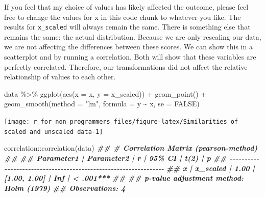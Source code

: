\documentclass[
]{book}
\newenvironment{Shaded}{\begin{snugshade}}{\end{snugshade}}
\newcommand{\AttributeTok}[1]{\textcolor[rgb]{0.77,0.63,0.00}{#1}}
\newcommand{\ConstantTok}[1]{\textcolor[rgb]{0.00,0.00,0.00}{#1}}
\newcommand{\DocumentationTok}[1]{\textcolor[rgb]{0.56,0.35,0.01}{\textbf{\textit{#1}}}}
\newcommand{\FunctionTok}[1]{\textcolor[rgb]{0.00,0.00,0.00}{#1}}
\newcommand{\NormalTok}[1]{#1}
\newcommand{\SpecialCharTok}[1]{\textcolor[rgb]{0.00,0.00,0.00}{#1}}
\newcommand{\StringTok}[1]{\textcolor[rgb]{0.31,0.60,0.02}{#1}}
\begin{document}
If you feel that my choice of values has likely affected the outcome, please feel free to change the values for x in this code chunk to whatever you like. The results for \texttt{x\_scaled} will always remain the same. There is something else that remains the same: the actual distribution. Because we are only rescaling our data, we are not affecting the differences between these scores. We can show this in a scatterplot and by running a correlation. Both will show that these variables are perfectly correlated. Therefore, our transformations did not affect the relative relationship of values to each other.

\begin{Shaded}
\begin{Highlighting}[]
\NormalTok{data }\SpecialCharTok{\%\textgreater{}\%}
  \FunctionTok{ggplot}\NormalTok{(}\FunctionTok{aes}\NormalTok{(}\AttributeTok{x =}\NormalTok{ x,}
             \AttributeTok{y =}\NormalTok{ x\_scaled)) }\SpecialCharTok{+}
  \FunctionTok{geom\_point}\NormalTok{() }\SpecialCharTok{+}
  \FunctionTok{geom\_smooth}\NormalTok{(}\AttributeTok{method =} \StringTok{"lm"}\NormalTok{,}
              \AttributeTok{formula =}\NormalTok{ y }\SpecialCharTok{\textasciitilde{}}\NormalTok{ x,}
              \AttributeTok{se =} \ConstantTok{FALSE}\NormalTok{)}
\end{Highlighting}
\end{Shaded}

\begin{center}\texttt{[image: r\_for\_non\_programmers\_files/figure-latex/Similarities of scaled and unscaled data-1]} \end{center}

\begin{Shaded}
\begin{Highlighting}[]
\NormalTok{correlation}\SpecialCharTok{::}\FunctionTok{correlation}\NormalTok{(data)}
\DocumentationTok{\#\# \# Correlation Matrix (pearson{-}method)}
\DocumentationTok{\#\# }
\DocumentationTok{\#\# Parameter1 | Parameter2 |    r |       95\% CI | t(2) |         p}
\DocumentationTok{\#\# {-}{-}{-}{-}{-}{-}{-}{-}{-}{-}{-}{-}{-}{-}{-}{-}{-}{-}{-}{-}{-}{-}{-}{-}{-}{-}{-}{-}{-}{-}{-}{-}{-}{-}{-}{-}{-}{-}{-}{-}{-}{-}{-}{-}{-}{-}{-}{-}{-}{-}{-}{-}{-}{-}{-}{-}{-}{-}{-}{-}{-}{-}{-}{-}}
\DocumentationTok{\#\# x          |   x\_scaled | 1.00 | [1.00, 1.00] |  Inf | \textless{} .001***}
\DocumentationTok{\#\# }
\DocumentationTok{\#\# p{-}value adjustment method: Holm (1979)}
\DocumentationTok{\#\# Observations: 4}
\end{Highlighting}
\end{Shaded}
\end{document}
